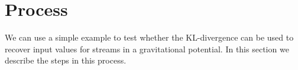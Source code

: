 \documentclass[useAMS,usenatbib,a4paper]{mn2e}
\begin{document}


\section{Process}
\label{sec:process}

We can use a simple example to test whether the KL-divergence can be used to recover input values for streams in a gravitational potential. In this section we describe the steps in this process. 
\end{document}
